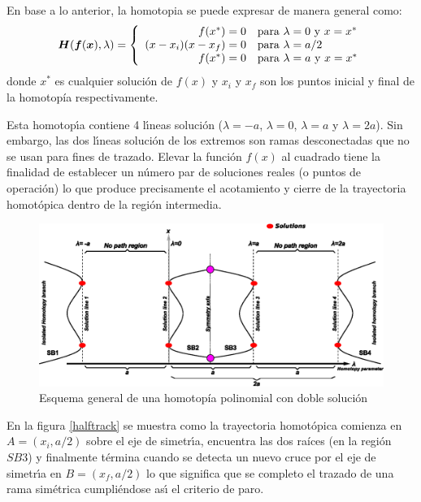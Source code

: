 \documentclass[conference,letterpaper,onecolumn]{IEEEtran}
\newcommand{\pig}[1]{\mbox{\boldmath ${#1}$}	}
\begin{document}
En base a lo anterior, la homotopia se puede expresar de manera general como:
\begin{displaymath}
\pig{H}(\pig{f}(\pig{x}),\lambda ) = \left\{\begin{array}{rl}
f(x^*)=0 & \textrm{para $\lambda=0$ y $x=x^*$}\\
(x-x_i)(x-x_f)=0 & \textrm{para $\lambda=a/2$}\\
f(x^*)=0 & \textrm{para $\lambda=a$ y $x=x^*$}
\end{array}\right.
\end{displaymath}
donde $x^*$ es cualquier soluci\'on de $f(x)$ y $x_i$ y $x_f$ son los puntos inicial y final de la homotop{\'i}a respectivamente. 




Esta homotop\'{\i}a contiene 4 l\'{\i}neas soluci\'on ($\lambda=-a$, $\lambda=0$, $\lambda=a$ y $\lambda=2a$). Sin embargo, las dos l\'{\i}neas soluci\'on de los extremos son ramas
desconectadas que no se usan para fines de trazado. Elevar la funci\'on $f(x)$ al cuadrado tiene la finalidad de establecer un n\'umero par de soluciones reales (o puntos de operaci\'on) lo que
produce precisamente el acotamiento y cierre de la trayectoria homot\'opica dentro de la regi\'on intermedia.


\begin{figure}[tbp]
{\tiny  
\centerline{
\centering
\includegraphics[width=14cm]{figs/doblelineapoli.eps}}}
\caption{Esquema general de una homotop\'ia polinomial con doble soluci\'on}
\label{doblehp}
\end{figure}


En la figura  \ref{halftrack} se muestra como la trayectoria homot\'opica comienza en $A=(x_i,a/2)$ sobre
el eje de simetr\'{\i}a, encuentra las dos ra{\'i}ces (en la regi\'on $SB3$)  y finalmente t\'ermina cuando se detecta  un nuevo cruce por el eje de simetr\'{\i}a en $B=(x_f,a/2)$ lo que significa
que se completo el trazado de una rama sim\'etrica cumpli\'endose as\'{\i} el criterio de paro.
\end{document}
